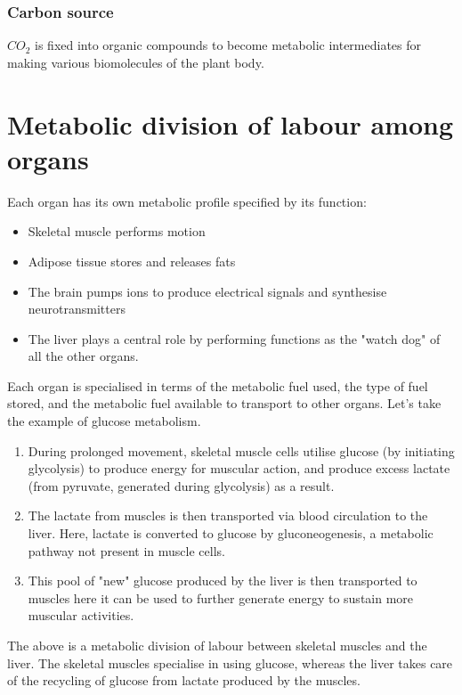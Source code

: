 \documentclass[11pt]{article}
\begin{document}
\subsubsection{Carbon source}
\label{sec:org3820818}
\(CO_2\) is fixed into organic compounds to become metabolic intermediates for making various biomolecules of the plant body.
\section{Metabolic division of labour among organs}
\label{sec:org1b6985b}
Each organ has its own metabolic profile specified by its function:
\begin{itemize}
\item Skeletal muscle performs motion
\item Adipose tissue stores and releases fats
\item The brain pumps ions to produce electrical signals and synthesise neurotransmitters
\item The liver plays a central role by performing functions as the "watch dog" of all the other organs.
\end{itemize}

Each organ is specialised in terms of the metabolic fuel used, the type of fuel stored, and the metabolic fuel available to transport to other organs. Let's take the example of glucose metabolism.


\begin{enumerate}
\item During prolonged movement, skeletal muscle cells utilise glucose (by initiating glycolysis) to produce energy for muscular action, and produce excess lactate (from pyruvate, generated during glycolysis) as a result.
\item The lactate from muscles is then transported via blood circulation to the liver. Here, lactate is converted to glucose by gluconeogenesis, a metabolic pathway not present in muscle cells.
\item This pool of "new" glucose produced by the liver is then transported to muscles here it can be used to further generate energy to sustain more muscular activities.
\end{enumerate}

The above is a metabolic division of labour between skeletal muscles and the liver. The skeletal muscles specialise in using glucose, whereas the liver takes care of the recycling of glucose from lactate produced by the muscles.
\end{document}
